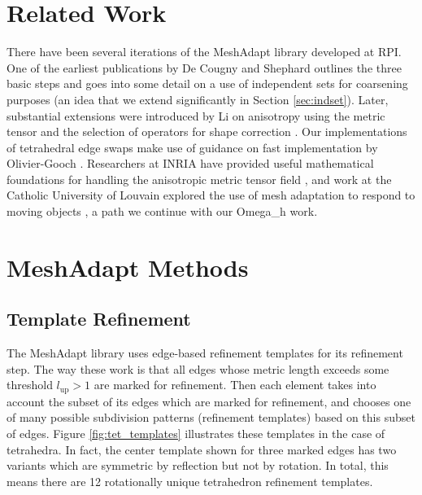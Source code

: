 \section{Related Work}

There have been several iterations of the MeshAdapt
library developed at RPI.
One of the earliest publications by De Cougny and Shephard
\cite{de1999parallel} outlines the three basic steps and goes into some detail
on a use of independent sets for coarsening purposes
(an idea that we extend significantly in Section \ref{sec:indset}).
Later, substantial extensions were introduced by Li on anisotropy using the metric
tensor and the selection of operators for shape correction
\cite{li2003mesh,li20053d}.
Our implementations of tetrahedral edge swaps make use
of guidance on fast implementation by Olivier-Gooch \cite{freitag1997tetrahedral}.
Researchers at INRIA have provided useful mathematical foundations
for handling the anisotropic metric tensor field
\cite{loseille2015parallel,frey2005,alauzet2006parallel},
and work at the Catholic University of Louvain explored
the use of mesh adaptation to respond to moving objects
\cite{compere2010mesh}, a path we continue with our Omega\_h work.

\section{MeshAdapt Methods}
\label{sec:ma_methods}

\subsection{Template Refinement}
\label{sec:ma_refine}

The MeshAdapt library uses edge-based refinement templates for its refinement step.
The way these work is that all edges whose metric length exceeds some threshold
$l_{\text{up}} > 1$ are marked for refinement.
Then each element takes into account the subset of its edges which are marked
for refinement, and chooses one of many possible subdivision patterns
(refinement templates) based on this subset of edges.
Figure \ref{fig:tet_templates} illustrates these templates in the case of tetrahedra.
In fact, the center template shown for three marked edges has two variants which
are symmetric by reflection but not by rotation.
In total, this means there are 12 rotationally unique tetrahedron refinement templates.

